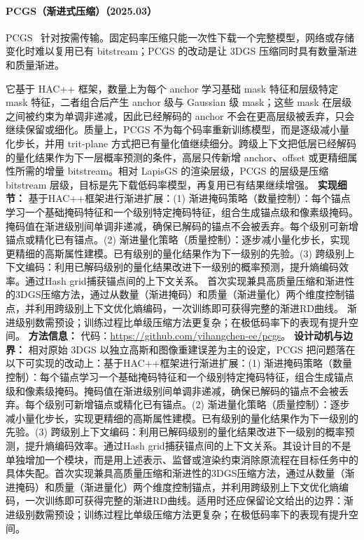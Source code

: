 \paragraph{PCGS（渐进式压缩）（2025.03）}
PCGS~\cite{2503_08511} 针对按需传输。固定码率压缩只能一次性下载一个完整模型，网络或存储变化时难以复用已有 bitstream；PCGS 的改动是让 3DGS 压缩同时具有数量渐进和质量渐进。

它基于 HAC++ 框架，数量上为每个 anchor 学习基础 mask 特征和层级特定 mask 特征，二者组合后产生 anchor 级与 Gaussian 级 mask；这些 mask 在层级之间被约束为单调非递减，因此已经解码的 anchor 不会在更高层级被丢弃，只会继续保留或细化。质量上，PCGS 不为每个码率重新训练模型，而是逐级减小量化步长，并用 trit-plane 方式把已有量化值继续细分。跨级上下文把低层已经解码的量化结果作为下一层概率预测的条件，高层只传新增 anchor、offset 或更精细属性所需的增量 bitstream。相对 LapisGS 的渲染层级，PCGS 的层级是压缩 bitstream 层级，目标是先下载低码率模型，再复用已有结果继续增强。
\textbf{实现细节：} 基于HAC++框架进行渐进扩展：(1) 渐进掩码策略（数量控制）：每个锚点学习一个基础掩码特征和一个级别特定掩码特征，组合生成锚点级和像素级掩码。掩码值在渐进级别间单调非递减，确保已解码的锚点不会被丢弃。每个级别可新增锚点或精化已有锚点。(2) 渐进量化策略（质量控制）：逐步减小量化步长，实现更精细的高斯属性建模。已有级别的量化结果作为下一级别的先验。(3) 跨级别上下文编码：利用已解码级别的量化结果改进下一级别的概率预测，提升熵编码效率。通过Hash grid捕获锚点间的上下文关系。 首次实现兼具高质量压缩和渐进性的3DGS压缩方法，通过从数量（渐进掩码）和质量（渐进量化）两个维度控制锚点，并利用跨级别上下文优化熵编码，一次训练即可获得完整的渐进RD曲线。 渐进级别数需预设；训练过程比单级压缩方法更复杂；在极低码率下的表现有提升空间。
\textbf{方法信息：} 代码：\url{https://github.com/yihangchen-ee/pcgs}。
\textbf{设计动机与边界：} 相对原始 3DGS 以独立高斯和图像重建误差为主的设定，PCGS 把问题落在以下可实现的改动上：基于HAC++框架进行渐进扩展：(1) 渐进掩码策略（数量控制）：每个锚点学习一个基础掩码特征和一个级别特定掩码特征，组合生成锚点级和像素级掩码。掩码值在渐进级别间单调非递减，确保已解码的锚点不会被丢弃。每个级别可新增锚点或精化已有锚点。(2) 渐进量化策略（质量控制）：逐步减小量化步长，实现更精细的高斯属性建模。已有级别的量化结果作为下一级别的先验。(3) 跨级别上下文编码：利用已解码级别的量化结果改进下一级别的概率预测，提升熵编码效率。通过Hash grid捕获锚点间的上下文关系。其设计目的不是单独增加一个模块，而是用上述表示、监督或渲染约束消除原流程在目标任务中的具体失配。首次实现兼具高质量压缩和渐进性的3DGS压缩方法，通过从数量（渐进掩码）和质量（渐进量化）两个维度控制锚点，并利用跨级别上下文优化熵编码，一次训练即可获得完整的渐进RD曲线。适用时还应保留论文给出的边界：渐进级别数需预设；训练过程比单级压缩方法更复杂；在极低码率下的表现有提升空间。
